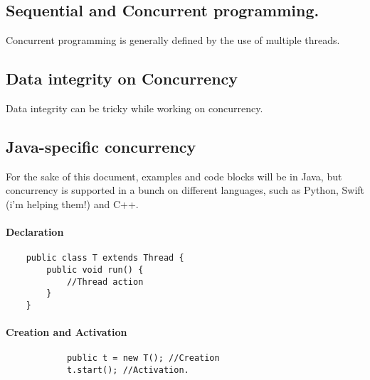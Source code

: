 \documentclass[12pt,a4paper,teal]{bbe}
\begin{document}
	\subsection{Sequential and Concurrent programming.}
	\begin{definition}
		Concurrent programming is generally defined by the use of multiple threads.

	\end{definition}

	\subsection{Data integrity on Concurrency}
	Data integrity can be tricky while working on concurrency.

	\subsection{Java-specific concurrency}
		\begin{remark}
			For the sake of this document, examples and code blocks will be in Java,
			but concurrency is supported in a bunch on different languages, such
			as Python, Swift (i'm helping them!) and C++.
		\end{remark}
		
	\paragraph*{Declaration}
	\begin{verbatim}
	public class T extends Thread {
		public void run() {
			//Thread action
		}
	}
	\end{verbatim}
	

	\paragraph*{Creation and Activation}
		\begin{verbatim}
			public t = new T(); //Creation
			t.start(); //Activation.	
		\end{verbatim}
\end{document}
